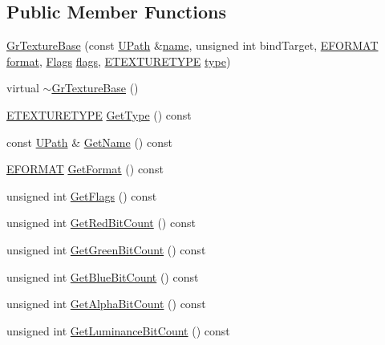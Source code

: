 \begin{CompactItemize}
\subsection*{Public Member Functions}
\begin{CompactItemize}
\item 
\hyperlink{class_gr_texture_base_3927e8796074e075c490b8a1827ccc3b}{GrTextureBase} (const \hyperlink{class_u_path}{UPath} \&\hyperlink{glext__bak_8h_bb62efe59ccdd153ce42e1a418352209}{name}, unsigned int bindTarget, \hyperlink{class_gr_texture_base_82c606022e93566ba55fe4cd3beb687c}{EFORMAT} \hyperlink{glext__bak_8h_e2d3db041c6004a67047659b42f73a44}{format}, \hyperlink{class_gr_texture_base_bee6ecbc7a70ea5f2acab8341a9696b5}{Flags} \hyperlink{_u_t_message_8h_0a3c0b351ab09281b662a9ff4f900a53}{flags}, \hyperlink{class_gr_texture_base_5ce3676de03c3c565a9a0995334e5308}{ETEXTURETYPE} \hyperlink{glext__bak_8h_7d05960f4f1c1b11f3177dc963a45d86}{type})
\item 
virtual \hyperlink{class_gr_texture_base_dac31ced75ce320ff6aa16373b225085}{$\sim$GrTextureBase} ()
\item 
\hyperlink{class_gr_texture_base_5ce3676de03c3c565a9a0995334e5308}{ETEXTURETYPE} \hyperlink{class_gr_texture_base_d0b985795ad1856b64d17b8404b2ca08}{GetType} () const 
\item 
const \hyperlink{class_u_path}{UPath} \& \hyperlink{class_gr_texture_base_7e10acc5b93473c8149f3d7fa12fb905}{GetName} () const 
\item 
\hyperlink{class_gr_texture_base_82c606022e93566ba55fe4cd3beb687c}{EFORMAT} \hyperlink{class_gr_texture_base_9238a4bd7db2676e072b3eb85b14c684}{GetFormat} () const 
\item 
unsigned int \hyperlink{class_gr_texture_base_6ef12d9062a6178f2bf497334761f357}{GetFlags} () const 
\item 
unsigned int \hyperlink{class_gr_texture_base_d3d44c7785028f08063c8c446d0e91a1}{GetRedBitCount} () const 
\item 
unsigned int \hyperlink{class_gr_texture_base_f8b32cd3c21488e40e0667d6a253320a}{GetGreenBitCount} () const 
\item 
unsigned int \hyperlink{class_gr_texture_base_8f049be60f5a5d093575d72914451351}{GetBlueBitCount} () const 
\item 
unsigned int \hyperlink{class_gr_texture_base_4bac8a806715c03befeec5f83ceeb41f}{GetAlphaBitCount} () const 
\item 
unsigned int \hyperlink{class_gr_texture_base_62deff3983812f7ff630ceb7021cd7b8}{GetLuminanceBitCount} () const 

\end{CompactItemize}
\end{CompactItemize}
